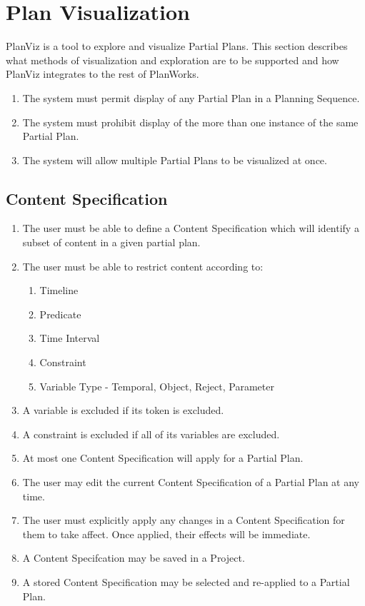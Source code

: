 \documentclass[twoside, 11pt]{article}
\begin{document}
\section{Plan Visualization}
PlanViz is a tool to explore and visualize Partial Plans. This section describes what methods of visualization and exploration are to be supported and how PlanViz integrates to the rest of PlanWorks.
\begin{enumerate}
\item The system must permit display of any Partial Plan in a Planning Sequence.
\item The system must prohibit display of the more than one instance of the same Partial Plan.
\item The system will allow multiple Partial Plans to be visualized at once.
\end{enumerate}
\subsection{Content Specification}
\begin{enumerate}
\item The user must be able to define a Content Specification which will identify a subset of content in a given partial plan.
\item The user must be able to restrict content according to:
\begin{enumerate}
\item Timeline
\item Predicate
\item Time Interval
\item Constraint
\item Variable Type - Temporal, Object, Reject, Parameter
\end{enumerate}
\item A variable is excluded if its token is excluded.
\item A constraint is excluded if all of its variables are excluded.
\item At most one Content Specification will apply for a Partial Plan.
\item The user may edit the current Content Specification of a Partial Plan at any time.
\item The user must explicitly apply any changes in a Content Specification for them to take affect. Once applied, their effects will be immediate.
\item A Content Specifcation may be saved in a Project.
\item A stored Content Specification may be selected and re-applied to a Partial Plan.
\end{enumerate}
\end{document}
